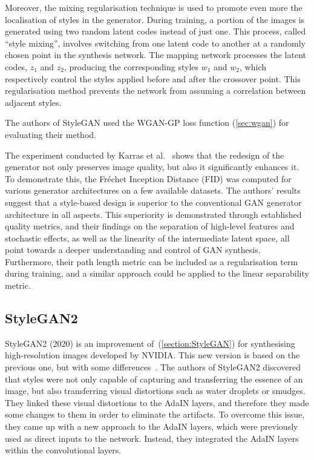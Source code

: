 \noindent Moreover, the mixing regularisation technique is used to promote even more the localisation of styles in the generator. During training, a portion of the images is generated using two random latent codes instead of just one. This process, called “style mixing”, involves switching from one latent code to another at a randomly chosen point in the synthesis network. The mapping network processes the latent codes, $z_1$ and $z_2$, producing the corresponding styles $w_1$ and $w_2$, which respectively control the styles applied before and after the crossover point. This regularisation method prevents the network from assuming a correlation between adjacent styles. 

%
\noindent The authors of StyleGAN used the WGAN-GP loss function (\ref{sec:wgan}) for evaluating their method.

\noindent The experiment conducted by Karras et al.~\cite{StyleGAN} shows that the redesign of the generator not only preserves image quality, but also it significantly enhances it. To demonstrate this, the Fréchet Inception Distance (FID) was computed for various generator architectures on a few available datasets.
The authors' results suggest that a style-based design is superior to the conventional GAN generator architecture in all aspects.
This superiority is demonstrated through established quality metrics, and their findings on the separation of high-level features and stochastic effects, as well as the linearity of the intermediate latent space, all point towards a deeper understanding and control of GAN synthesis.
Furthermore, their path length metric can be included as a regularisation term during training, and a similar approach could be applied to the linear separability metric.

\subsection{StyleGAN2}
\label{section:StyleGAN2}
StyleGAN2 (2020) is an improvement of~(\ref{section:StyleGAN}) for synthesising high-resolution images developed by NVIDIA. This new version is based on the previous one, but with some differences~\cite{Karras2019stylegan2}.
The authors of StyleGAN2 discovered that styles were not only capable of capturing and transferring the essence of an image, but also transferring visual distortions such as water droplets or smudges.
They linked these visual distortions to the AdaIN layers, and therefore they made some changes to them in order to eliminate the artifacts. 
To overcome this issue, they came up with a new approach to the AdaIN layers, which were previously used as direct inputs to the network. Instead, they integrated the AdaIN layers within the convolutional layers.

